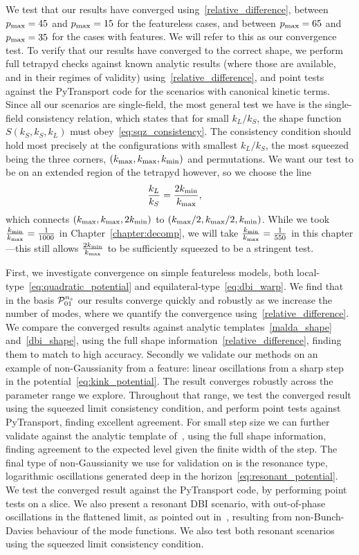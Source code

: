 We test that our results have converged using~\eqref{relative_difference},
between $p_\text{max}=45$ and $p_\text{max}=15$ for the featureless cases,
and between $p_\text{max}=65$ and $p_\text{max}=35$ for the cases with features.
We will refer to this as our convergence test.
To verify that our results have converged to the correct shape,
we perform full tetrapyd checks against known analytic results
(where those are available, and in their regimes of validity)
using~\eqref{relative_difference},
and point tests against the PyTransport code for the scenarios
with canonical kinetic terms.
Since all our scenarios are single-field, the most general
test we have is the single-field consistency relation,
which states that for small $k_L/k_S$, the shape function $S(k_S,k_S,k_L)$
must obey~\eqref{eq:sqz_consistency}.
The consistency condition should hold most precisely
at the configurations with smallest $k_L/k_S$,
the most squeezed being the three corners, $({k_\text{max}},{k_\text{max}},{k_\text{min}})$ and permutations.
We want our test to be on an extended region of the tetrapyd however,
so we choose the line
\begin{align}\label{sqz_line}
    \frac{k_L}{k_S}&=\frac{2{k_\text{min}}}{{k_\text{max}}},
\end{align}
which connects $({k_\text{max}},{k_\text{max}},2{k_\text{min}})$ to $({k_\text{max}}/2,{k_\text{max}}/2,{k_\text{min}})$.
While we took $\frac{{k_\text{min}}}{{k_\text{max}}}=\frac{1}{1000}$ in Chapter~\ref{chapter:decomp},
we will take $\frac{{k_\text{min}}}{{k_\text{max}}}=\frac{1}{550}$ in this chapter---this
still allows $\frac{2{k_\text{min}}}{{k_\text{max}}}$ to be sufficiently squeezed to be a stringent test.

First, we investigate convergence on simple featureless models,
both local-type~\eqref{eq:quadratic_potential}
and equilateral-type~\eqref{eq:dbi_warp}.
We find that in the basis $\mathcal{P}^{n_s}_{01}$ our results
converge quickly and robustly as we increase the number of modes,
where we quantify the convergence using~\eqref{relative_difference}.
We compare the converged results against analytic
templates~\eqref{malda_shape} and~\eqref{dbi_shape},
using the full shape information~\eqref{relative_difference},
finding them to match to high accuracy.
Secondly we validate our methods on an example of non-Gaussianity
from a feature: linear oscillations from a sharp step in the
potential~\eqref{eq:kink_potential}. The result converges robustly
across the parameter range we explore. Throughout that range,
we test the converged result using the squeezed limit consistency
condition, and perform point tests against PyTransport,
finding excellent agreement.
For small step size we can further validate against the analytic template
of~\cite{adshead}, using the full shape information, finding agreement
to the expected level given the finite width of the step.
The final type of non-Gaussianity we use for validation on is the resonance
type, logarithmic oscillations generated deep in the horizon~\eqref{eq:resonant_potential}.
We test the converged result against the PyTransport
code, by performing point tests on a slice.
We also present a resonant DBI scenario, with out-of-phase oscillations
in the flattened limit, as pointed out in~\cite{chen_folded_resonant},
resulting from non-Bunch-Davies behaviour of the mode functions.
We also test both resonant scenarios using the squeezed limit consistency condition.


